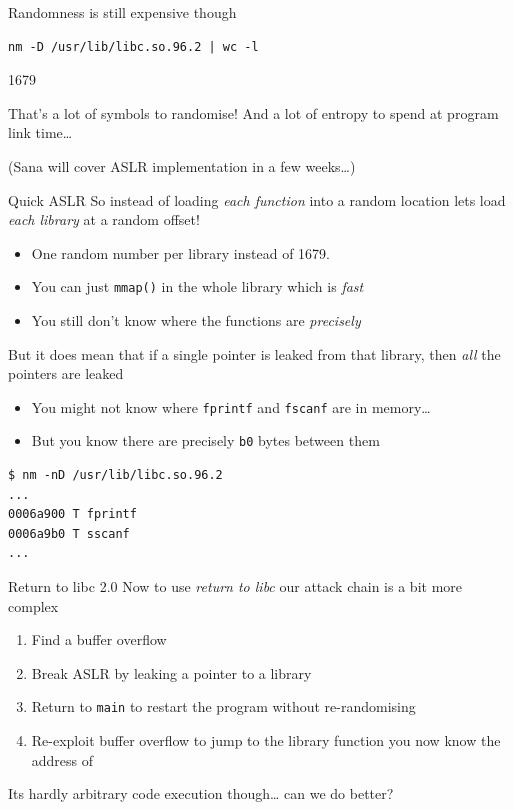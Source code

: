 \documentclass[9pt,aspectratio=169]{beamer}
\begin{document}
\begin{frame}[label={sec:orga1affc8},fragile]{Randomness is still expensive though}
 \begin{verbatim}
nm -D /usr/lib/libc.so.96.2 | wc -l
\end{verbatim}
1679

That's a lot of symbols to randomise!
And a lot of entropy to spend at program link time\ldots{}

(Sana will cover ASLR implementation in a few weeks\ldots{})
\end{frame}

\begin{frame}[label={sec:org69f87ec},fragile]{Quick ASLR}
 So instead of loading \emph{each function} into a random location lets load \emph{each library} at a random offset!
\begin{itemize}
\item One random number per library instead of 1679.
\item You can just \texttt{mmap()} in the whole library which is \emph{fast}
\item You still don't know where the functions are \emph{precisely}
\end{itemize}

But it does mean that if a single pointer is leaked from that library, then \emph{all} the pointers are leaked
\begin{itemize}
\item You might not know where \texttt{fprintf} and \texttt{fscanf} are in memory\ldots{}
\item But you know there are precisely \texttt{b0} bytes between them
\end{itemize}
\begin{verbatim}
$ nm -nD /usr/lib/libc.so.96.2 
...
0006a900 T fprintf
0006a9b0 T sscanf
...
\end{verbatim}
\end{frame}

\begin{frame}[label={sec:org15fb314},fragile]{Return to libc 2.0}
 Now to use \emph{return to libc} our attack chain is a bit more complex

\begin{enumerate}
\item Find a buffer overflow
\item Break ASLR by leaking a pointer to a library
\item Return to \texttt{main} to restart the program without re-randomising
\item Re-exploit buffer overflow to jump to the library function you now know the address of
\end{enumerate}

Its hardly arbitrary code execution though\ldots{} can we do better?
\end{frame}
\end{document}
